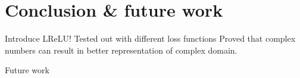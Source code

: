 \chapter{Conclusion \& future work} \label{chap:experiments}


Introduce LReLU! 
Tested out with different loss functions
Proved that complex numbers can result in better representation of complex domain. 

Future work